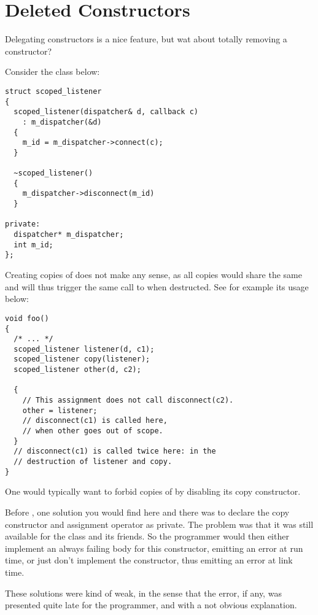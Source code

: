 \section{Deleted Constructors}

Delegating constructors is a nice feature, but wat about totally
removing a constructor?

Consider the class below:

\begin{lstlisting}
struct scoped_listener
{
  scoped_listener(dispatcher& d, callback c)
    : m_dispatcher(&d)
  {
    m_id = m_dispatcher->connect(c);
  }

  ~scoped_listener()
  {
    m_dispatcher->disconnect(m_id)
  }

private:
  dispatcher* m_dispatcher;
  int m_id;
};
\end{lstlisting}

Creating copies of  does not make any sense, as
all copies would share the same  and will thus trigger the
same call to  when destructed. See for example
its usage below:

\begin{lstlisting}
void foo()
{
  /* ... */
  scoped_listener listener(d, c1);
  scoped_listener copy(listener);
  scoped_listener other(d, c2);

  {
    // This assignment does not call disconnect(c2).
    other = listener;
    // disconnect(c1) is called here,
    // when other goes out of scope.
  }
  // disconnect(c1) is called twice here: in the
  // destruction of listener and copy.
}
\end{lstlisting}

One would typically want to forbid copies of  by
disabling its copy constructor.

Before , one solution you would find here and there was to
declare the copy constructor and assignment operator as private. The
problem was that it was still available for the class and its
friends. So the programmer would then either implement an always
failing body for this constructor, emitting an error at run time, or
just don't implement the constructor, thus emitting an error at link
time.

These solutions were kind of weak, in the sense that the error, if
any, was presented quite late for the programmer, and with a not
obvious explanation.

